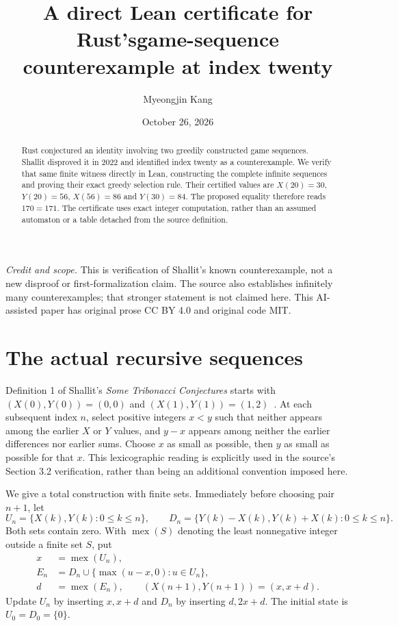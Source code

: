 \documentclass[11pt]{article}
\title{A direct Lean certificate for Rust's\newline game-sequence counterexample at index twenty}
\author{Myeongjin Kang}
\date{October 26, 2026}
\newcommand{\mex}{\operatorname{mex}}
\begin{document}
\maketitle
\begin{abstract}
Rust conjectured an identity involving two greedily constructed game
sequences. Shallit disproved it in 2022 and identified index twenty as a
counterexample. We verify that same finite witness directly in Lean,
constructing the complete infinite sequences and proving their exact
greedy selection rule. Their certified values are $X(20)=30$, $Y(20)=56$,
$X(56)=86$ and $Y(30)=84$. The proposed equality therefore reads $170=171$.
The certificate uses exact integer computation, rather than an assumed
automaton or a table detached from the source definition.
\end{abstract}
\noindent\textit{Credit and scope.} This is verification of Shallit's known
counterexample, not a new disproof or first-formalization claim. The source
also establishes infinitely many counterexamples; that stronger statement
is not claimed here. This AI-assisted paper has original prose CC BY 4.0
and original code MIT.

\section{The actual recursive sequences}
Definition 1 of Shallit's \emph{Some Tribonacci Conjectures} starts with
$(X(0),Y(0))=(0,0)$ and $(X(1),Y(1))=(1,2)$~\cite{Shallit}.
At each subsequent index $n$, select positive integers $x<y$ such that
neither appears among the earlier $X$ or $Y$ values, and $y-x$ appears
among neither the earlier differences nor earlier sums. Choose $x$ as
small as possible, then $y$ as small as possible for that $x$. This
lexicographic reading is explicitly used in the source's Section 3.2
verification, rather than being an additional convention imposed here.

We give a total construction with finite sets. Immediately before choosing
pair $n+1$, let
\[
 U_n=\{X(k),Y(k):0\le k\le n\},\qquad
 D_n=\{Y(k)-X(k),Y(k)+X(k):0\le k\le n\}.
\]
Both sets contain zero. With $\mex(S)$ denoting the least nonnegative
integer outside a finite set $S$, put
\begin{align*}
 x&=\mex(U_n),\\
 E_n&=D_n\cup\{\max(u-x,0):u\in U_n\},\\
 d&=\mex(E_n),\qquad (X(n+1),Y(n+1))=(x,x+d).
\end{align*}
Update $U_n$ by inserting $x,x+d$ and $D_n$ by inserting $d,2x+d$.
The initial state is $U_0=D_0=\{0\}$.
\end{document}
